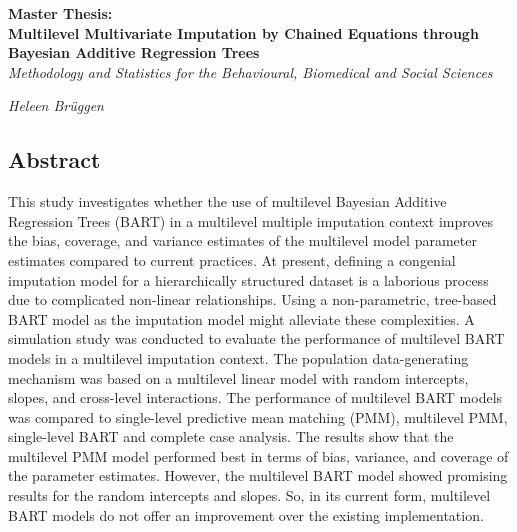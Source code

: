 \documentclass[10pt, a4paper, titlepage]{article}
\begin{document}
\begin{titlingpage}
\begin{center}
\Huge\textbf{Master Thesis:  \\ Multilevel Multivariate Imputation by Chained Equations through Bayesian Additive Regression Trees} \\
\Large\textit{Methodology and Statistics for the Behavioural, Biomedical and Social Sciences}

\vspace{.5cm}

\normalsize\textit{Heleen Brüggen}

\vspace{1cm}

\begin{minipage}{1\textwidth}
\begin{center}
\section*{Abstract}
\end{center}
\end{minipage}

\vspace{.25cm}

\begin{minipage}{1\textwidth}
    This study investigates whether the use of multilevel Bayesian Additive Regression Trees (BART) in a multilevel multiple imputation context improves the bias, coverage, and variance estimates of the multilevel model parameter estimates compared to current practices. At present, defining a congenial imputation model for a hierarchically structured dataset is a laborious process due to complicated non-linear relationships. Using a non-parametric, tree-based BART model as the imputation model might alleviate these complexities. A simulation study was conducted to evaluate the performance of multilevel BART models in a multilevel imputation context. The population data-generating mechanism was based on a multilevel linear model with random intercepts, slopes, and cross-level interactions. The performance of multilevel BART models was compared to single-level predictive mean matching (PMM), multilevel PMM, single-level BART and complete case analysis. The results show that the multilevel PMM model performed best in terms of bias, variance, and coverage of the parameter estimates. However, the multilevel BART model showed promising results for the random intercepts and slopes. So, in its current form, multilevel BART models do not offer an improvement over the existing implementation.
\end{minipage}


\end{center}
\end{titlingpage}
\end{document}
